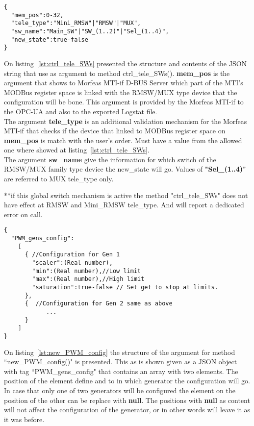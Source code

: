 \begin{lstlisting}[frame=single,caption=Argument for ctrl\_tele\_SWs(), label=lst:ctrl_tele_SWs]
{
  "mem_pos":0-32,
  "tele_type":"Mini_RMSW"|"RMSW"|"MUX",
  "sw_name":"Main_SW"|"SW_(1..2)"|"Sel_(1..4)",
  "new_state":true-false
}
\end{lstlisting}
On listing~\ref{lst:ctrl_tele_SWs} presented the structure and contents of the JSON string that use as argument to method ctrl\_tele\_SWs().
\textbf{mem\_pos} is the argument that shows to Morfeas MTI-if D-BUS Server which part of the MTI's MODBus register space is linked with the RMSW/MUX type device that the configuration will be bone.
This argument is provided by the Morfeas MTI-if to the OPC-UA and also to the exported Logstat file.\\
The argument \textbf{tele\_type} is an additional validation mechanism for the Morfeas MTI-if that checks if the device that linked to MODBus register space on \textbf{mem\_pos} is match with the user's order.
Must have a value from the allowed one where showed at listing~\ref{lst:ctrl_tele_SWs}.\\
The argument \textbf{sw\_name} give the information for which switch of the RMSW/MUX family type device the new\_state will go. Values of \textbf{"Sel\_(1..4)"} are referred to MUX tele\_type only.

**if this global switch mechanism is active the method "ctrl\_tele\_SWs" does not have effect at RMSW and Mini\_RMSW tele\_type. And will report a dedicated error on call.

\begin{lstlisting}[frame=single,caption=Argument for new\_PWM\_config(), label=lst:new_PWM_config]
{
  "PWM_gens_config":
    [
	  { //Configuration for Gen 1
		"scaler":(Real number),
		"min":(Real number),//Low limit
		"max":(Real number),//High limit
		"saturation":true-false // Set get to stop at limits.
	  },
	  {  //Configuration for Gen 2 same as above
            ...
	  }
    ]
}
\end{lstlisting}
On listing~\ref{lst:new_PWM_config} the structure of the argument for method ``new\_PWM\_config()" is presented.
This as is shown given as a JSON object with tag ``PWM\_gens\_config" that contains an array with two elements. The position of the element define and to in which generator the configuration will go.
In case that only one of two generators will be configured the element on the position of the other can be replace with \textbf{null}.
The positions with \textbf{null} as content will not affect the configuration of the generator, or in other words will leave it as it was before.

